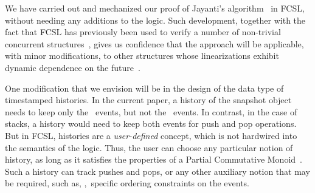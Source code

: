 We have carried out and mechanized our proof of Jayanti's
algorithm~\cite{Jayanti+STOC05} in FCSL, without needing any additions
to the logic.
%
%
Such development, together with the fact that FCSL has previously been
used to verify a number of non-trivial concurrent
structures~\cite{SergeyNB+ESOP15,SergeyNB+PLDI15,SergeyNBD+OOPSLA16},
gives us confidence that the approach will be applicable, with minor
modifications, to other structures whose linearizations exhibit
dynamic dependence on the
future~\cite{DoddsHK+POPL15,Morrison-al:PPoPP13,Hoffman-al:OPODIS07}.


One modification that we envision will be in the design of the data
type of timestamped histories. In the current paper, a history of the
snapshot object needs to keep only the \jywrite\ events, but not the
\jyscan\ events. In contrast, in the case of stacks, a history would
need to keep both events for push and pop operations. But in FCSL,
histories are a \emph{user-defined} concept, which is not hardwired
into the semantics of the logic. Thus, the user can choose any
particular notion of history, as long as it satisfies the properties
of a Partial Commutative
Monoid~\cite{LeyWildN+POPL13,NanevskiLSD+ESOP14}. Such a history can
track pushes and pops, or any other auxiliary notion that may be
required, such as, \eg,~specific ordering constraints on the events.



